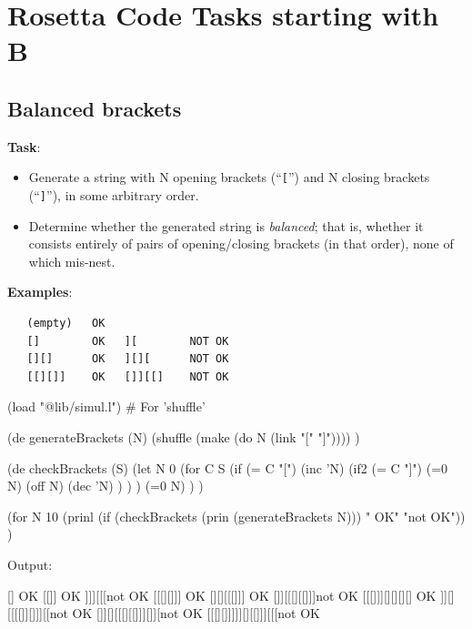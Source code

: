 %
%
%

\chapter{Rosetta Code Tasks starting with B}

\section*{Balanced brackets}


\textbf{Task}:

\begin{itemize}
\item
  Generate a string with N opening brackets (``\texttt{{[}}'') and N
  closing brackets (``\texttt{{]}}''), in some arbitrary order.
\item
  Determine whether the generated string is \emph{balanced}; that is,
  whether it consists entirely of pairs of opening/closing brackets (in
  that order), none of which mis-nest.
\end{itemize}

\textbf{Examples}:

\begin{verbatim}
   (empty)   OK
   []        OK   ][        NOT OK
   [][]      OK   ][][      NOT OK
   [[][]]    OK   []][[]    NOT OK
\end{verbatim}



\begin{wideverbatim}

(load "@lib/simul.l")  # For 'shuffle'

(de generateBrackets (N)
   (shuffle (make (do N (link "[" "]")))) )

(de checkBrackets (S)
   (let N 0
      (for C S
         (if (= C "[")
            (inc 'N)
            (if2 (= C "]") (=0 N)
               (off N)
               (dec 'N) ) ) )
      (=0 N) ) )

(for N 10
   (prinl (if (checkBrackets (prin (generateBrackets N))) " OK" "not OK")) )

Output:

[] OK
[[]] OK
]]][[[not OK
[[[][]]] OK
[][][[[]]] OK
[]][[[][[]]]not OK
[[[]]][][][][] OK
]][][[[[]][]]][[not OK
[]][][[[][[]]][]][not OK
[[[][]]]]][][[]]][[[not OK

\end{wideverbatim}

